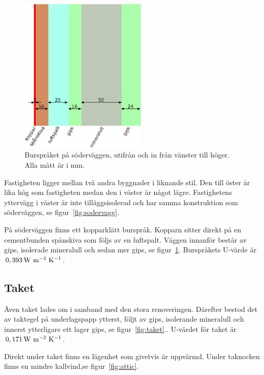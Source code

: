 \begin{figure}[hpbt]
\centering
\includegraphics[width=6cm]{images/bursprak.eps}
\caption{\label{fig:bursprak}{Burspråket på söderväggen, utifrån och in från vänster till höger. Alla mått är i mm.}}
\end{figure}

Fastigheten ligger mellan två andra byggnader i liknande stil. Den till öster är lika hög som fastigheten medan den i väster är något lägre. Fastighetens yttervägg i väster är inte tilläggsisolerad och har samma konstruktion som söderväggen, se figur~\ref{fig:sodervagg}.

På söderväggen finns ett kopparklätt burspråk. Kopparn sitter direkt på en cementbunden spånskiva som följs av en luftspalt. Väggen innanför består av gips, isolerade mineralull och sedan mer gips, se figur~\ref{fig:bursprak}.\cite{kandidatarbete2010} Burspråkets U-värde är $\unit[0,393]{W~m^{-2}~K^{-1}}$.

\subsection{Taket}
Även taket lades om i samband med den stora renoveringen. Därefter bestod det av taktegel på underlagspapp ytterst, följt av gips, isolerande mineralull och innerst ytterligare ett lager gips, se figur~\ref{fig:taket}.\cite{kandidatarbete2010}. U-värdet för taket är $\unit[0,171]{W~m^{-2}~K^{-1}}$.

Direkt under taket finns en lägenhet som givetvis är uppvärmd. Under taknocken finns en mindre kallvind,se figur~\ref{fig:attic}. 

